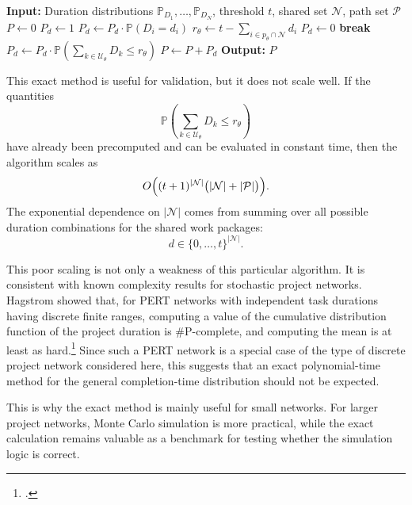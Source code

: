 \documentclass[11pt,a4paper]{article}
\newcommand{\pP}{\mathbb{P}}
\newcommand{\1}{\mathbf{1}}
\theoremstyle{definition}
\theoremstyle{plain}
\theoremstyle{remark}
\numberwithin{equation}{section}
\begin{document}
\begin{algorithm}[H]
\caption{Exact calculation of $\pP(T_{\text{Project}}\leq t)$ for a small discrete project network}
\label{alg:cdf_T_project}
\begin{algorithmic}[1]
\State \textbf{Input:} Duration distributions $\pP_{D_1},\ldots,\pP_{D_N}$, threshold $t$, shared set $\mathcal{N}$, path set $\mathcal{P}$
\State $P\leftarrow 0$
    \State $P_d\leftarrow 1$
        \State $P_d\leftarrow P_d\cdot \pP(D_i=d_i)$
    \EndFor
        \State $r_\theta\leftarrow t-\sum_{i\in p_\theta\cap\mathcal{N}}d_i$
            \State $P_d\leftarrow 0$
            \State \textbf{break}
        \Else
            \State $P_d\leftarrow P_d\cdot
            \pP\left(
            \sum_{k\in\mathcal{U}_\theta}D_k
            \leq r_\theta
            \right)$
        \EndIf
    \EndFor
    \State $P\leftarrow P+P_d$
\EndFor
\State \textbf{Output:} $P$
\end{algorithmic}
\end{algorithm}

This exact method is useful for validation, but it does not scale well. If the quantities
\[
\pP\left(
\sum_{k\in\mathcal{U}_\theta}D_k
\leq r_\theta
\right)
\]
have already been precomputed and can be evaluated in constant time, then the algorithm scales as
\[
O\Bigl((t+1)^{|\mathcal{N}|}\bigl(|\mathcal{N}|+|\mathcal{P}|\bigr)\Bigr).
\]
The exponential dependence on $|\mathcal{N}|$ comes from summing over all possible duration combinations for the shared work packages:
\[
d\in\{0,\ldots,t\}^{|\mathcal{N}|}.
\]

This poor scaling is not only a weakness of this particular algorithm. It is consistent with known complexity results for stochastic project networks. Hagstrom showed that, for PERT networks with independent task durations having discrete finite ranges, computing a value of the cumulative distribution function of the project duration is \#P-complete, and computing the mean is at least as hard.\footcite{hagstrom1988computational} Since such a PERT network is a special case of the type of discrete project network considered here, this suggests that an exact polynomial-time method for the general completion-time distribution should not be expected.

This is why the exact method is mainly useful for small networks. For larger project networks, Monte Carlo simulation is more practical, while the exact calculation remains valuable as a benchmark for testing whether the simulation logic is correct.
\end{document}
